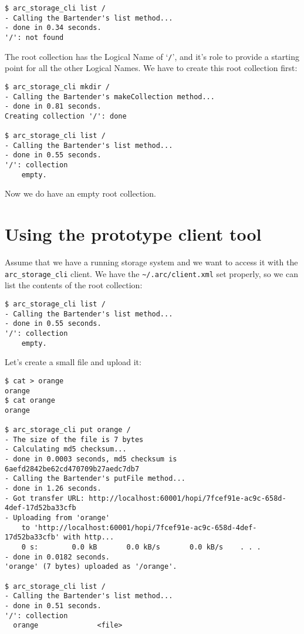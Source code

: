 \documentclass{book}
\begin{document}
\begin{verbatim}
$ arc_storage_cli list /
- Calling the Bartender's list method...
- done in 0.34 seconds.
'/': not found
\end{verbatim}

The root collection has the Logical Name of `\verb!/!', and it's role to provide a starting point for all the other Logical Names. We have to create this root collection first:

\begin{verbatim}
$ arc_storage_cli mkdir /
- Calling the Bartender's makeCollection method...
- done in 0.81 seconds.
Creating collection '/': done

$ arc_storage_cli list /
- Calling the Bartender's list method...
- done in 0.55 seconds.
'/': collection
    empty.
\end{verbatim}

Now we do have an empty root collection.

\section{Using the prototype client tool} %

Assume that we have a running storage system and we want to access it with the \verb!arc_storage_cli! client. We have the \verb!~/.arc/client.xml! set properly, so we can list the contents of the root collection:

\begin{verbatim}
$ arc_storage_cli list /
- Calling the Bartender's list method...
- done in 0.55 seconds.
'/': collection
    empty.
\end{verbatim}

Let's create a small file and upload it:

\begin{verbatim}
$ cat > orange
orange
$ cat orange 
orange

$ arc_storage_cli put orange /
- The size of the file is 7 bytes
- Calculating md5 checksum...
- done in 0.0003 seconds, md5 checksum is 6aefd2842be62cd470709b27aedc7db7
- Calling the Bartender's putFile method...
- done in 1.26 seconds.
- Got transfer URL: http://localhost:60001/hopi/7fcef91e-ac9c-658d-4def-17d52ba33cfb
- Uploading from 'orange'
    to 'http://localhost:60001/hopi/7fcef91e-ac9c-658d-4def-17d52ba33cfb' with http...
    0 s:        0.0 kB       0.0 kB/s       0.0 kB/s    . . .       
- done in 0.0182 seconds.
'orange' (7 bytes) uploaded as '/orange'.

$ arc_storage_cli list /
- Calling the Bartender's list method...
- done in 0.51 seconds.
'/': collection
  orange              <file>

\end{verbatim}
\end{document}
